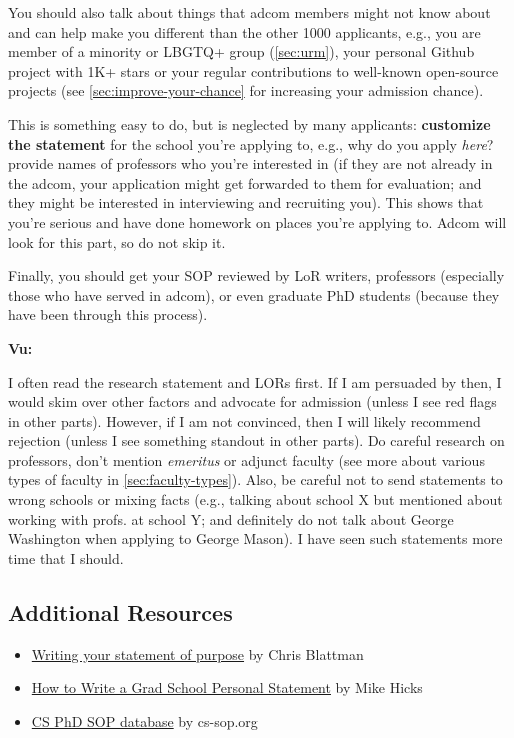 \documentclass[oneside,11pt,dvipsnames]{book}
\newenvironment{commentbox}[1][]{
  \small
  \begin{mybox}
    {\small \textbf{#1}}
  }{
  \end{mybox}
}
\begin{document}
You should also talk about things that adcom members might not know about and can help make you different than the other 1000 applicants, e.g., you are member of a minority or LBGTQ+ group (\autoref{sec:urm}), your personal Github project with 1K+ stars or your regular contributions to well-known open-source projects (see \autoref{sec:improve-your-chance} for increasing your admission chance).


This is something easy to do, but is neglected by many
applicants: \textbf{customize the statement} for the school you're applying to,
e.g., why do you apply \emph{here}? provide names of professors who you're interested in (if they are not already in the adcom, your application might get forwarded to them for evaluation; and they might be interested in interviewing and recruiting you).
This shows that you're serious and have done homework on places you're applying to.
Adcom will look for this part, so do not skip it.

Finally, you should get your SOP reviewed by LoR writers, professors (especially those who have served in adcom), or even graduate PhD students (because they have been through this process).

\begin{commentbox}[Vu:]
  I often read the research statement and LORs first. If I am
  persuaded by then, I would skim over other factors and advocate for
  admission (unless I see red flags in other parts). However, if I am not
  convinced, then I will likely recommend rejection (unless I see
  something standout in other parts).
  \tcblower
  Do careful research on professors, don't mention \emph{emeritus} or  adjunct faculty (see more about various types of faculty in \autoref{sec:faculty-types}).
  Also, be careful not to send statements to wrong schools or mixing
  facts (e.g., talking about school X but mentioned about working with
  profs. at school Y; and definitely do not talk about George Washington when applying to George Mason). I have seen such statements more time that I
  should.
\end{commentbox}



\subsection*{Additional Resources}
\begin{itemize}
    \item \href{https://chrisblattman.com/blog/2022/01/11/}{Writing your statement of purpose} by Chris Blattman
  \item \href{http://www.pl-enthusiast.net/2022/10/03/how-to-write-a-grad-school-personal-statement/}{How to Write a Grad School Personal Statement} by Mike Hicks
  \item     \href{https://cs-sop.notion.site/cs-sop/CS-PhD-Statements-of-Purpose-df39955313834889b7ac5411c37b958d?p=f5d5980a71524ebaa4e6ae57266b847c&pm=s}{CS PhD SOP database} by cs-sop.org
\end{itemize}
\end{document}
